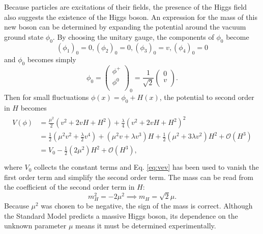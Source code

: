 Because particles are excitations of their fields, the presence of the Higgs field also suggests the existence of the Higgs boson. An expression for the mass of this new boson can be determined by expanding the potential around the vacuum ground state $\phi_{0}$. By choosing the unitary gauge, the components of $\phi_{0}$ become
\begin{equation}
  (\phi_{1})_{0} = 0, (\phi_{2})_{0} = 0, (\phi_{3})_{0} = v, (\phi_{4})_{0} = 0
\end{equation}
and $\phi_{0}$ becomes simply
\begin{equation}
  \phi_{0} = \begin{pmatrix}
               \phi^{+} \\
               \phi^{0} \\
             \end{pmatrix}_{0}
           = \frac{1}{\sqrt{2}}
             \begin{pmatrix}
               0 \\
               v \\
             \end{pmatrix}.
\end{equation}
Then for small fluctuations $\phi(x) = \phi_{0} + H(x)$, the potential to second order in $H$ becomes
\begin{align}
  \begin{split}
    V(\phi) &= \frac{\mu^{2}}{2}(v^{2} + 2vH + H^{2}) + \frac{\lambda}{4}(v^{2} + 2vH + H^{2})^{2} \\
            &= \frac{1}{2}(\mu^{2}v^{2} + \frac{\lambda}{2}v^{4}) + (\mu^{2}v + \lambda v^{3})H + \frac{1}{2}(\mu^{2} + 3\lambda v^{2})H^{2} + \mathcal{O}(H^{3}) \\
            &= V_{0} - \frac{1}{2}(2\mu^{2})H^{2} + \mathcal{O}(H^{3}), \\
  \end{split}
\end{align}
where $V_{0}$ collects the constant terms and Eq. \ref{eq:vev} has been used to vanish the first order term and simplify the second order term. The mass can be read from the coefficient of the second order term in $H$:
\begin{equation}
  m_{H}^{2} = -2\mu^{2} \implies m_{H} = \sqrt{2}\mu.
\end{equation}
Because $\mu^2$ was chosen to be negative, the sign of the mass is correct. Although the Standard Model predicts a massive Higgs boson, its dependence on the unknown parameter $\mu$ means it must be determined experimentally.

